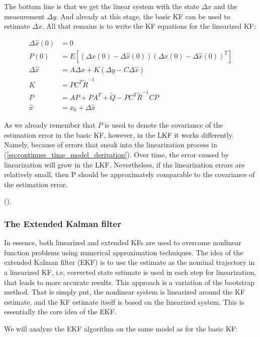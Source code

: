 The bottom line is that we get the linear system with the state \(\Delta x \) and the measurement \(\Delta y\). And already at this stage, the basic KF can be used to estimate \(\Delta x \). All that remains is to write the KF equations for the linearized KF:

\begin{equation}
\begin{aligned}
\Delta \hat{x}(0) &=0 \\
P(0) &=E\left[(\Delta x(0)-\Delta \hat{x}(0))(\Delta x(0)-\Delta \hat{x}(0))^T\right] \\
\Delta \hat{x} &=A \Delta \hat{x}+K(\Delta y-C \Delta \hat{x}) \\
K &=P C^T \tilde{R}^{-1} \\
P &=A P+P A^T+\tilde{Q}-P C^T \tilde{R}^{-1} C P \\
\hat{x} &=x_0+\Delta \hat{x}
\end{aligned}
\end{equation}

As we already remember that \(P\) is used to denote the covariance of the estimation error in the basic KF, however, in the LKF it works differently. Namely, because of errors that sneak into the linearization process in (\ref{eq:continues_time_model_derivation}). Over time, the error caused by linearization will grow in the LKF. Nevertheless, if the linearization errors are relatively small, then P should be approximately comparable to the covariance of the estimation error.

(\cite[Section~13.1]{simon_optimal_2006}).

\subsubsection{The Extended Kalman filter}
In essence, both linearized and extended KFs are used to overcome nonlinear function problems using numerical approximation techniques. The idea of the extended Kalman filter (EKF) is to use the estimate as the nominal trajectory in a linearized KF, i.e, corrected state estimate is used in each step for linearization, that leads to more accurate results. This approach is a variation of the bootstrap method. That is simply put, the nonlinear system is linearized around the KF estimate, and the KF estimate itself is based on the linearized system. This is essentially the core idea of the EKF.

We will analyze the EKF algorithm on the same model as for the basic KF:

